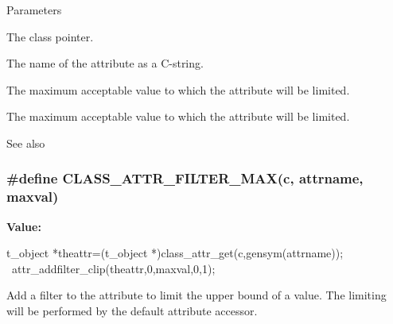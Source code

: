 \begin{DoxyParams}{Parameters}
\item[{\em c}]The class pointer. \item[{\em attrname}]The name of the attribute as a C-\/string. \item[{\em minval}]The maximum acceptable value to which the attribute will be limited. \item[{\em maxval}]The maximum acceptable value to which the attribute will be limited. \end{DoxyParams}
\begin{DoxySeeAlso}{See also}

\end{DoxySeeAlso}
\hypertarget{group__attr_ga6d756455a9923aa01a16796b7d458fd9}{
\subsubsection[{CLASS\_\-ATTR\_\-FILTER\_\-MAX}]{\setlength{\rightskip}{0pt plus 5cm}\#define CLASS\_\-ATTR\_\-FILTER\_\-MAX(c, \/  attrname, \/  maxval)}}
\label{group__attr_ga6d756455a9923aa01a16796b7d458fd9}
{\bfseries Value:}
\begin{DoxyCode}
{ t_object *theattr=(t_object *)class_attr_get(c,gensym(attrname)); \
        attr_addfilter_clip(theattr,0,maxval,0,1); }
\end{DoxyCode}


Add a filter to the attribute to limit the upper bound of a value. The limiting will be performed by the default attribute accessor.


